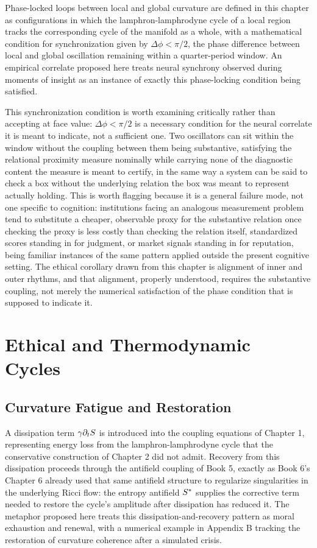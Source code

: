Phase-locked loops between local and global curvature are defined in this chapter as configurations in which the lamphron-lamphrodyne cycle of a local region tracks the corresponding cycle of the manifold as a whole, with a mathematical condition for synchronization given by $\Delta\phi < \pi/2$, the phase difference between local and global oscillation remaining within a quarter-period window. An empirical correlate proposed here treats neural synchrony observed during moments of insight as an instance of exactly this phase-locking condition being satisfied.

This synchronization condition is worth examining critically rather than accepting at face value: $\Delta\phi < \pi/2$ is a necessary condition for the neural correlate it is meant to indicate, not a sufficient one. Two oscillators can sit within the window without the coupling between them being substantive, satisfying the relational proximity measure nominally while carrying none of the diagnostic content the measure is meant to certify, in the same way a system can be said to check a box without the underlying relation the box was meant to represent actually holding. This is worth flagging because it is a general failure mode, not one specific to cognition: institutions facing an analogous measurement problem tend to substitute a cheaper, observable proxy for the substantive relation once checking the proxy is less costly than checking the relation itself, standardized scores standing in for judgment, or market signals standing in for reputation, being familiar instances of the same pattern applied outside the present cognitive setting. The ethical corollary drawn from this chapter is alignment of inner and outer rhythms, and that alignment, properly understood, requires the substantive coupling, not merely the numerical satisfaction of the phase condition that is supposed to indicate it.

\part{Ethical and Thermodynamic Cycles}

\chapter{Curvature Fatigue and Restoration}

A dissipation term $\gamma \partial_t S$ is introduced into the coupling equations of Chapter 1, representing energy loss from the lamphron-lamphrodyne cycle that the conservative construction of Chapter 2 did not admit. Recovery from this dissipation proceeds through the antifield coupling of Book 5, exactly as Book 6's Chapter 6 already used that same antifield structure to regularize singularities in the underlying Ricci flow: the entropy antifield $S^{*}$ supplies the corrective term needed to restore the cycle's amplitude after dissipation has reduced it. The metaphor proposed here treats this dissipation-and-recovery pattern as moral exhaustion and renewal, with a numerical example in Appendix B tracking the restoration of curvature coherence after a simulated crisis.

